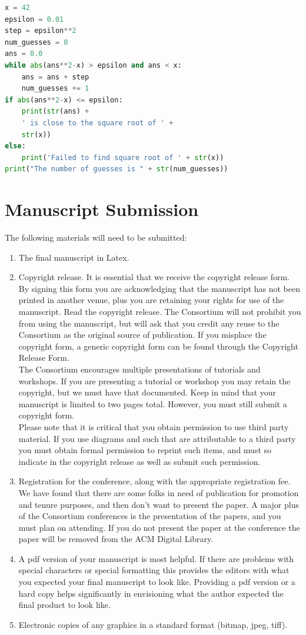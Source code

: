 \documentclass[article,twoside]{combine}
\begin{document}
\begin{lstlisting}[language=Python,  caption=Python example]
x = 42
epsilon = 0.01
step = epsilon**2
num_guesses = 0
ans = 0.0
while abs(ans**2-x) > epsilon and ans < x:
    ans = ans + step
    num_guesses += 1
if abs(ans**2-x) <= epsilon:
    print(str(ans) +
    ' is close to the square root of ' +
    str(x))
else:
    print('Failed to find square root of ' + str(x))
print("The number of guesses is " + str(num_guesses))
\end{lstlisting}

\section{Manuscript Submission}
The following materials will need to be submitted:
\begin{enumerate}[noitemsep]
  \item The final manuscript in Latex.
  \item Copyright release. It is essential that we receive the copyright
  release form. By signing this form you are acknowledging that the manuscript
  has not been printed in another venue, plus you are retaining your rights for
  use of the manuscript. Read the copyright release. The Consortium will not
  prohibit you from using the manuscript, but will ask that you credit any reuse
  to the Consortium as the original source of publication. If you misplace the
  copyright form, a generic copyright form can be found through the Copyright
  Release Form\cite{copyright}.\\
  The Consortium encourages multiple presentations of tutorials and workshops.
  If you are presenting a tutorial or workshop you may retain the copyright,
  but we must have that documented. Keep in mind that your manuscript is limited
  to two pages total. However, you must still submit a copyright form.\\
  Please note that it is critical that you obtain permission to use third party
  material. If you use diagrams and such that are attributable to a third party
  you must obtain formal permission to reprint such items, and must so indicate
  in the copyright release as well as submit such permission.
  \item Registration for the conference, along with the appropriate registration
  fee. We have found that there are some folks in need of publication for
  promotion and tenure purposes, and then don’t want to present the paper.
  A major plus of the Consortium conferences is the presentation of the papers,
  and you must plan on attending. If you do not present the paper at the
  conference the paper will be removed from the ACM Digital Library.
  \item A pdf version of your manuscript is most helpful. If there are problems
  with special characters or special formatting this provides the editors with
  what you expected your final manuscript to look like. Providing a pdf version
  or a hard copy helps significantly in envisioning what the author expected
  the final product to look like.
  \item Electronic copies of any graphics in a standard format (bitmap, jpeg, tiff).
\end{enumerate}
\end{document}

